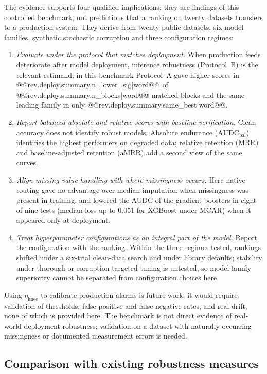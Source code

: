 \documentclass[pdflatex,sn-mathphys]{sn-jnl}
\theoremstyle{thmstyleone}
\theoremstyle{thmstyletwo}
\theoremstyle{thmstylethree}
\newcommand{\AUDC}{\mathrm{AUDC}}
\newcommand{\MRR}{\mathrm{MRR}}
\newcommand{\aMRR}{\mathrm{aMRR}}
\newcommand{\etaknee}{\eta_{\mathrm{knee}}}
\begin{document}
The evidence supports four qualified implications; they are findings of this controlled benchmark, not predictions that a ranking on twenty datasets transfers to a production system. They derive from twenty public datasets, six model families, synthetic stochastic corruption and three configuration regimes:
\begin{enumerate}
\item \emph{Evaluate under the protocol that matches deployment.} When production feeds deteriorate after model deployment, inference robustness (Protocol~B) is the relevant estimand; in this benchmark Protocol~A gave higher scores in @@{rev.deploy.summary.n_lower_sig|word}@@ of @@{rev.deploy.summary.n_blocks|word}@@ matched blocks and the same leading family in only @@{rev.deploy.summary.same_best|word}@@.
\item \emph{Report balanced absolute and relative scores with baseline verification.} Clean accuracy does not identify robust models. Absolute endurance ($\AUDC_{\mathrm{bal}}$) identifies the highest performers on degraded data; relative retention ($\MRR$) and baseline-adjusted retention ($\aMRR$) add a second view of the same curves.
\item \emph{Align missing-value handling with where missingness occurs.} Here native routing gave no advantage over median imputation when missingness was present in training, and lowered the AUDC of the gradient boosters in eight of nine tests (median loss up to 0.051 for XGBoost under MCAR) when it appeared only at deployment.
\item \emph{Treat hyperparameter configurations as an integral part of the model.} Report the configuration with the ranking. Within the three regimes tested, rankings shifted under a six-trial clean-data search and under library defaults; stability under thorough or corruption-targeted tuning is untested, so model-family superiority cannot be separated from configuration choices here.
\end{enumerate}
Using $\etaknee$ to calibrate production alarms is future work: it would require validation of thresholds, false-positive and false-negative rates, and real drift, none of which is provided here. The benchmark is not direct evidence of real-world deployment robustness; validation on a dataset with naturally occurring missingness or documented measurement errors is needed.

\subsection{Comparison with existing robustness measures}\label{sec:disc:measures}
\end{document}
